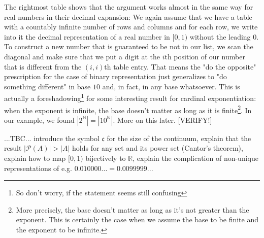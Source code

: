 \medskip
The rightmost table shows that the argument works almost in the same way for real numbers in their decimal expansion: We again assume that we have a table with a countably infinite number of rows and columns and for each row, we write into it the decimal representation of a real number in $[0,1)$ without the leading $0$. To construct a new number that is guaranteed to be not in our list, we scan the diagonal and make sure that we put a digit at the $i$th position of our number that is different from the $(i,i)$th table entry. That means the "do the opposite" prescription for the case of binary representation just generalizes to "do something different" in base $10$ and, in fact, in any base whatsoever. This is actually a foreshadowing\footnote{So don't worry, if the statement seems still confusing} for some interesting result for cardinal exponentiation: when the exponent is infinite, the base doesn't matter as long as it is finite\footnote{More precisely, the base doesn't  matter as long as it's not greater than the exponent. This is certainly the case when we assume the base to be finite and the exponent to be infinite.}. In our example, we found $|2^{\mathbb{N}}| = |10^{\mathbb{N}}|$. More on this later. [VERIFY!]



\medskip
...TBC... introduce the symbol $\mathfrak{c}$ for the size of the continuum, explain that the result $|\mathcal{P}(A)| > |A|$ holds for any set and its power set (Cantor's theorem), explain how to map $[0,1)$ bijectively to $\mathbb{R}$, explain the complication of non-unique representations of e.g. $0.010000... = 0.0099999...$



